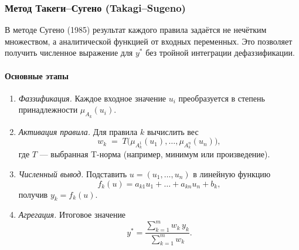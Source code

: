 \subsubsection{Метод Такеги–Сугено (Takagi–Sugeno)}
\label{subsubsec:sugeno}

В методе Сугено (1985) результат каждого правила задаётся не нечётким множеством, а аналитической функцией от входных переменных. Это позволяет получить численное выражение для $y^*$ без тройной интеграции дефаззификации.

\paragraph{Основные этапы}
\begin{enumerate}[label=\alph*)]
  \item \emph{Фаззификация.} Каждое входное значение $u_i$ преобразуется в степень принадлежности $\mu_{A_k}(u_i)$.
  \item \emph{Активация правила.} Для правила $k$ вычислить вес
    \[
      w_k \;=\; T\bigl(\mu_{A_k^1}(u_1),\dots,\mu_{A_k^n}(u_n)\bigr),
    \]
    где $T$ — выбранная T-норма (например, минимум или произведение).
  \item \emph{Численный вывод.} Подставить $u=(u_1,\dots,u_n)$ в линейную функцию
    \[
      f_k(u) = a_{k1}u_1 + \dots + a_{kn}u_n + b_k,
    \]
    получив $y_k = f_k(u)$.
  \item \emph{Агрегация.} Итоговое значение
    \[
      y^* = \frac{\sum_{k=1}^m w_k\,y_k}{\sum_{k=1}^m w_k}.
    \]
\end{enumerate}

